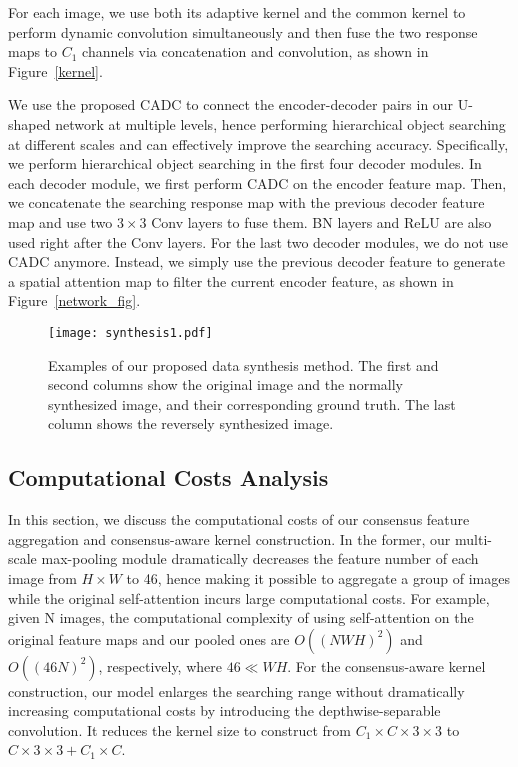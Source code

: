 \documentclass[10pt,twocolumn,letterpaper]{article}
\begin{document}
For each image, we use both its adaptive kernel and the common kernel to perform dynamic convolution simultaneously and then fuse the two response maps to $C_1$ channels via concatenation and convolution, as shown in Figure~\ref{kernel}.

We use the proposed CADC to connect the encoder-decoder pairs in our U-shaped network at multiple levels, hence performing hierarchical object searching at different scales and can effectively improve the searching accuracy.
Specifically, we perform hierarchical object searching in the first four decoder modules.
In each decoder module, we first perform CADC on the encoder feature map. Then, we concatenate the searching response map with the previous decoder feature map and use two $3 \times 3$ Conv layers to fuse them. 
BN \cite{ioffe2015bn} layers and ReLU are also used right after the Conv layers.
For the last two decoder modules, we do not use CADC anymore. Instead, we simply use the previous decoder feature to generate a spatial attention map to filter the current encoder feature, as shown in Figure~\ref{network_fig}.

\begin{figure}[!t]
  \graphicspath{{Figures/synthesis_strategy/}}
  \centering
  \texttt{[image: synthesis1.pdf]}
  \caption{Examples of our proposed data synthesis method. The first and second columns show the original image and the normally synthesized image, and their corresponding ground truth. The last column shows the reversely synthesized image.}
  \label{synthesis}
  \vspace{-0.3cm}
\end{figure}


\subsection{Computational Costs Analysis}
In this section, we discuss the computational costs of our consensus feature aggregation and consensus-aware kernel construction.
In the former, our multi-scale max-pooling module dramatically decreases the feature number of each image from $H \times W$ to 46, hence making it possible to aggregate a group of images while the original self-attention incurs large computational costs.
For example, given N images, the computational complexity of using self-attention on the original feature maps and our pooled ones are $O((NWH)^{2})$ and $O((46N)^{2})$, respectively, where $46\ll WH$.
For the consensus-aware kernel construction, our model enlarges the searching range without dramatically increasing computational costs by introducing the depthwise-separable convolution.
It reduces the kernel size to construct from $C_1 \times {C \times {3 \times 3}}$ to $C \times {3 \times 3} + C_1 \times C$.
\end{document}
